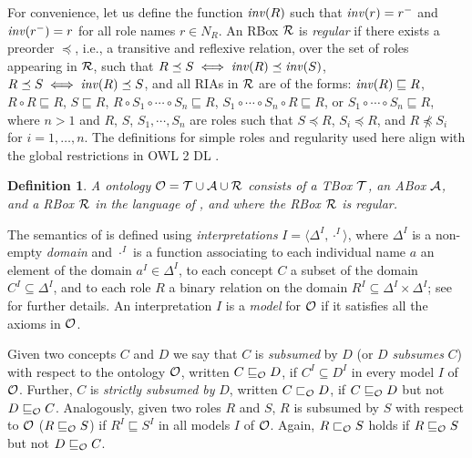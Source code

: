 \documentclass[
]{ceurart}
\newtheorem{definition}{Definition}
\begin{document}
For convenience, let us define the function $\mathit{inv}(R)$ such that $\mathit{inv}(r) = r^-$ and $\mathit{inv}(r^-) = r$ for all role names $r \in N_R$. 
%
An RBox $\mathcal{R}$ is  \emph{regular} if there exists a preorder $\preceq$, i.e., a transitive and reflexive relation, over the set of roles appearing in $\mathcal{R}$, such that
$R \preceq S \iff \mathit{inv}(R) \preceq \mathit{inv}(S)$, $R \preceq S \iff \mathit{inv}(R) \preceq S$, and all RIAs in $\mathcal{R}$ are of the forms:
$\mathit{inv}(R) \sqsubseteq R$,
$R \circ R \sqsubseteq R$,
$S \sqsubseteq R$, $R \circ S_1 \circ \cdots \circ S_n \sqsubseteq R$,
$S_1 \circ \cdots \circ S_n \circ R \sqsubseteq R$, or
$S_1 \circ \cdots \circ S_n \sqsubseteq R$,
where $n > 1$ and $R$, $S$, $S_1, \cdots, S_n$ are roles such that $S \preceq R$, $S_i \preceq R$, and $R \not\preceq S_i$ for $i = 1, \dots, n$. The definitions for simple roles and regularity used here align with the global restrictions in OWL 2 DL \cite{motik2012ontology}.

\begin{definition}
A \SROIQ  ontology $\mathcal{O} = \mathcal{T} \cup \mathcal{A} \cup \mathcal{R}$ consists of a TBox $\mathcal{T}$, an ABox $\mathcal{A}$, and a RBox $\mathcal{R}$ in the language of \SROIQ, and where the RBox $\mathcal{R}$ is regular.
\end{definition}

The semantics of \SROIQ is  defined using \emph{interpretations} $I = \langle \Delta^I, \cdot^I \rangle$, where $\Delta^I$ is a non-empty \emph{domain} and $\cdot^I$ is a function associating to each individual name $a$ an element of the domain $a^I \in \Delta^I$, to each concept $C$ a subset of the domain $C^I \subseteq \Delta^I$, and to each role $R$ a binary relation on the domain $R^I \subseteq \Delta^I \times \Delta^I$; see \cite{baader_horrocks_lutz_sattler_2017,HorrocksKutzSattlerKR2006} for further details. An interpretation $I$ is a \emph{model} for $\mathcal{O}$ if it satisfies all the axioms in $\mathcal{O}$.

Given two concepts $C$ and $D$ we say that $C$ is \emph{subsumed} by $D$ (or $D$ \emph{subsumes} $C$) with respect to the ontology $\mathcal{O}$, written $C \sqsubseteq_\mathcal{O} D$, if $C^I \subseteq D^I$ in every model $I$ of $\mathcal{O}$. Further, $C$ is \emph{strictly subsumed by} $D$, written $C \sqsubset_\mathcal{O} D$, if $C \sqsubseteq_\mathcal{O} D$ but not $D \sqsubseteq_\mathcal{O} C$. Analogously, given two roles $R$ and $S$, $R$ is subsumed by $S$ with respect to $\mathcal{O}$ ($R \sqsubseteq_\mathcal{O} S$) if $R^I \sqsubseteq S^I$ in all models $I$ of $\mathcal{O}$. Again, $R \sqsubset_\mathcal{O} S$ holds if $R \sqsubseteq_\mathcal{O} S$ but not $D \sqsubseteq_\mathcal{O} C$.
\end{document}
